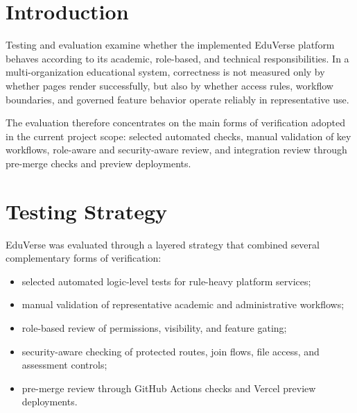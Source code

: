
\section{Introduction}\label{sec:testing_evaluation_introduction}

Testing and evaluation examine whether the implemented EduVerse platform
behaves according to its academic, role-based, and technical
responsibilities. In a multi-organization educational system, correctness is
not measured only by whether pages render successfully, but also by whether
access rules, workflow boundaries, and governed feature behavior operate
reliably in representative use.

The evaluation therefore concentrates on the main forms of verification adopted
in the current project scope: selected automated checks, manual validation of key
workflows, role-aware and security-aware review, and integration review through
pre-merge checks and preview deployments.

\section{Testing Strategy}\label{sec:testing_strategy}

EduVerse was evaluated through a layered strategy that combined several
complementary forms of verification:

\begin{itemize}
  \item selected automated logic-level tests for rule-heavy platform services;
  \item manual validation of representative academic and administrative
    workflows;
  \item role-based review of permissions, visibility, and feature gating;
  \item security-aware checking of protected routes, join flows, file access,
    and assessment controls;
  \item pre-merge review through GitHub Actions checks and Vercel preview
    deployments.
\end{itemize}


